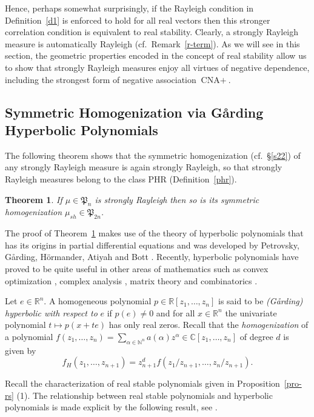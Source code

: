 \documentclass[10pt,reqno]{amsart}
\theoremstyle{plain}
\newtheorem{theorem}{Theorem}[section]
\theoremstyle{definition}
\theoremstyle{remark}
\newcommand{\NN}{\mathbb{N}}
\newcommand{\CNA}{\text{CNA}}
\newcommand{\RR}{\mathbb{R}}
\newcommand{\CC}{\mathbb{C}}
\newcommand{\fP}{\mathfrak{P}}
\begin{document}
Hence, perhaps somewhat surprisingly, if the Rayleigh condition 
in Definition~\ref{d1} is enforced to hold for all real vectors then this 
stronger correlation condition is equivalent to real stability. 
Clearly, a strongly Rayleigh measure is automatically Rayleigh 
(cf.~Remark~\ref{r-term}). As we will see in this section, the 
geometric properties encoded in the concept of real stability allow us 
to show that strongly Rayleigh measures 
enjoy all virtues of negative dependence, including the strongest
form of negative association $\CNA+$. 

\subsection{Symmetric Homogenization via G\aa rding Hyperbolic 
Polynomials}\label{s-gar}

The following theorem shows that the symmetric 
homogenization (cf.~\S \ref{s22}) of any strongly Rayleigh measure is again
strongly Rayleigh, so that 
strongly Rayleigh measures belong to the class PHR (Definition~\ref{phr}).
 
\begin{theorem}\label{SH}
If $\mu\in \fP_{n}$ is strongly Rayleigh then so is its symmetric 
homogenization $\mu_{sh}\in\fP_{2n}$.
\end{theorem}

The proof of Theorem~\ref{SH} makes use of the theory of hyperbolic 
polynomials that has its origins in partial differential equations 
and was developed by 
Petrovsky, G\aa rding, H\"ormander, Atiyah and Bott 
\cite{ABG,garding,hormander}. Recently, hyperbolic polynomials have proved
to be quite useful in other areas of mathematics such as convex optimization 
\cite{BGLS,guler}, complex analysis \cite{BBS}, matrix theory and 
combinatorics \cite{Gu1,Gu}. 

Let $e\in \RR^n$. A homogeneous polynomial $p \in \RR[z_1,\ldots, z_n]$ is 
said to be {\em (G\aa rding) hyperbolic with respect to} $e$ if $p(e)\neq 0$ 
and for all $x \in \RR^n$ the univariate polynomial 
$t \mapsto p(x+te)$ has only real zeros. Recall that the {\em homogenization} 
of a polynomial $f(z_1,\ldots,z_n)=\sum_{\alpha \in \NN^n}a(\alpha)z^\alpha  
\in \CC[z_1, \ldots, z_n]$ of degree $d$ is given by
 $$f_H(z_1,\ldots,z_{n+1}) = z_{n+1}^df(z_1/z_{n+1}, \ldots, z_n/z_{n+1}).$$  

Recall the characterization of real stable polynomials given in 
Proposition~\ref{pro-rs} (1). The relationship between 
real stable polynomials and hyperbolic polynomials is made explicit by the 
following result, see \cite[Proposition 1]{BBS2}.
\end{document}
